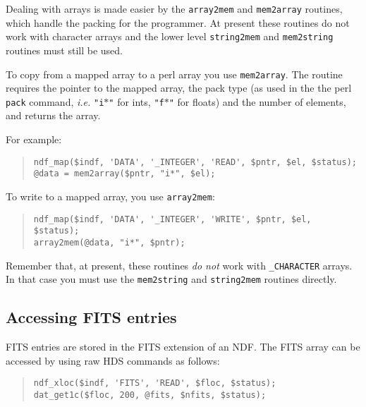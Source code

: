 \documentclass[twoside,11pt]{article}
\newcommand{\xlabel}[1]{}
\newenvironment{myquote}{\begin{quote}\begin{small}}{\end{small}\end{quote}}
\begin{document}
Dealing with arrays is made easier by the \texttt{array2mem} and
\texttt{mem2array}  routines, which handle the packing for the
programmer. At present these routines do not work with character arrays
and the lower level \texttt{string2mem} and \texttt{mem2string}
routines must still be used.

To copy from a mapped array to a perl array you use \texttt{mem2array}.
The routine requires the pointer to the mapped array, the pack type (as
used in the the perl \texttt{pack} command, \emph{i.e.}
\texttt{"i$\ast$"} for ints, \texttt{"f$\ast$"} for floats) and the
number of elements, and returns the array.

For example:
\begin{myquote}
\begin{verbatim}
ndf_map($indf, 'DATA', '_INTEGER', 'READ', $pntr, $el, $status);
@data = mem2array($pntr, "i*", $el);
\end{verbatim}
\end{myquote}

To write to a mapped array, you use \texttt{array2mem}:

\begin{myquote}
\begin{verbatim}
ndf_map($indf, 'DATA', '_INTEGER', 'WRITE', $pntr, $el, $status);
array2mem(@data, "i*", $pntr);
\end{verbatim}
\end{myquote}

Remember that, at present, these routines \emph{do not\/} work with
\texttt{\_CHARACTER} arrays. In that case you must use the
\texttt{mem2string} and \texttt{string2mem} routines directly.

\subsection{\xlabel{accessing_fits_entries}Accessing FITS entries}%
\label{accessing_fits_entries}

FITS entries are stored in the FITS extension of an NDF. The FITS array
can be accessed by using raw HDS commands as follows:

\begin{myquote}
\begin{verbatim}
ndf_xloc($indf, 'FITS', 'READ', $floc, $status);
dat_get1c($floc, 200, @fits, $nfits, $status);
\end{verbatim}
\end{myquote}
\end{document}
